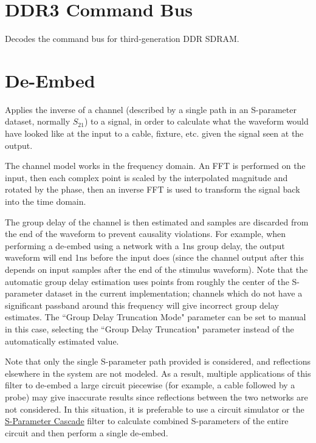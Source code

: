 \section{DDR3 Command Bus}

Decodes the command bus for third-generation DDR SDRAM.

\pagebreak
\section{De-Embed}
\label{filter:deembed}

Applies the inverse of a channel (described by a single path in an S-parameter dataset, normally $S_{21}$) to a signal,
in order to calculate what the waveform would have looked like at the input to a cable, fixture, etc. given the signal
seen at the output.

The channel model works in the frequency domain. An FFT is performed on the input, then each complex point is scaled by
the interpolated magnitude and rotated by the phase, then an inverse FFT is used to transform the signal back into the
time domain.

The group delay of the channel is then estimated and samples are discarded from the end of the waveform to prevent
causality violations. For example, when performing a de-embed using a network with a 1ns group delay, the output
waveform will end 1ns before the input does (since the channel output after this depends on input samples after the end
of the stimulus waveform). Note that the automatic group delay estimation uses points from roughly the center of the
S-parameter dataset in the current implementation; channels which do not have a significant passband around this
frequency will give incorrect group delay estimates. The ``Group Delay Truncation Mode" parameter can be set to manual
in this case, selecting the ``Group Delay Truncation" parameter instead of the automatically estimated value.

Note that only the single S-parameter path provided is considered, and reflections elsewhere in the system are not
modeled. As a result, multiple applications of this filter to de-embed a large circuit piecewise (for example, a cable
followed by a probe) may give inaccurate results since reflections between the two networks are not considered. In this
situation, it is preferable to use a circuit simulator or the \hyperref[filter:sparamcascade]{S-Parameter Cascade}
filter to calculate combined S-parameters of the entire circuit and then perform a single de-embed.


